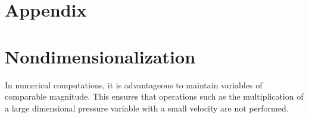 \documentclass{article}
\numberwithin{equation}{section}
\begin{document}
%
	
	

\pagebreak




\pagebreak
\appendix
\section{Appendix}


\section{Nondimensionalization}\label{sec:nondimensionalization}
In numerical computations, it is advantageous to maintain variables of comparable magnitude. This ensures that operations such as the multiplication of a large dimensional pressure variable with a small velocity are not performed. 
\end{document}
